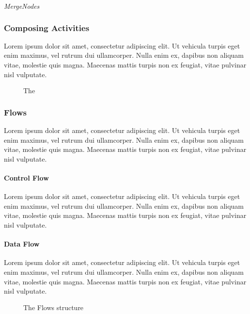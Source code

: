 \emph{MergeNodes} 

\subsubsection*{Composing Activities}

Lorem ipsum dolor sit amet, consectetur adipiscing elit. Ut vehicula turpis eget enim maximus, vel rutrum dui ullamcorper. Nulla enim ex, dapibus non aliquam vitae, molestie quis magna. Maecenas mattis turpis non ex feugiat, vitae pulvinar nisl vulputate.

\begin{figure}[!ht]
	\centering
	
	\caption{The }
	\label{fig:composite_activity}
\end{figure}

\subsubsection*{Flows}\label{ssec:flows}

Lorem ipsum dolor sit amet, consectetur adipiscing elit. Ut vehicula turpis eget enim maximus, vel rutrum dui ullamcorper. Nulla enim ex, dapibus non aliquam vitae, molestie quis magna. Maecenas mattis turpis non ex feugiat, vitae pulvinar nisl vulputate.

\paragraph{Control Flow}

Lorem ipsum dolor sit amet, consectetur adipiscing elit. Ut vehicula turpis eget enim maximus, vel rutrum dui ullamcorper. Nulla enim ex, dapibus non aliquam vitae, molestie quis magna. Maecenas mattis turpis non ex feugiat, vitae pulvinar nisl vulputate.

\paragraph{Data Flow}\label{par:data_flow}

Lorem ipsum dolor sit amet, consectetur adipiscing elit. Ut vehicula turpis eget enim maximus, vel rutrum dui ullamcorper. Nulla enim ex, dapibus non aliquam vitae, molestie quis magna. Maecenas mattis turpis non ex feugiat, vitae pulvinar nisl vulputate.

\begin{figure}[!ht]
	\centering
	
	\caption{The Flows structure}
	\label{fig:flows}
\end{figure}


